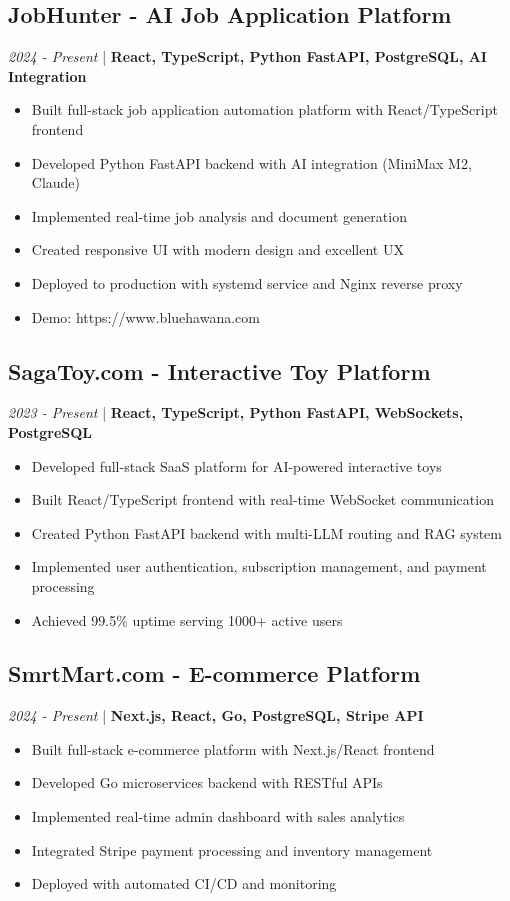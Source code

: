 \documentclass[11pt,a4paper]{article}
\begin{document}
\subsection*{JobHunter - AI Job Application Platform}
\textit{2024 - Present} | \textbf{React, TypeScript, Python FastAPI, PostgreSQL, AI Integration}
\begin{itemize}[leftmargin=*, itemsep=1pt]
\item Built full-stack job application automation platform with React/TypeScript frontend
\item Developed Python FastAPI backend with AI integration (MiniMax M2, Claude)
\item Implemented real-time job analysis and document generation
\item Created responsive UI with modern design and excellent UX
\item Deployed to production with systemd service and Nginx reverse proxy
\item Demo: https://www.bluehawana.com
\end{itemize}

\subsection*{SagaToy.com - Interactive Toy Platform}
\textit{2023 - Present} | \textbf{React, TypeScript, Python FastAPI, WebSockets, PostgreSQL}
\begin{itemize}[leftmargin=*, itemsep=1pt]
\item Developed full-stack SaaS platform for AI-powered interactive toys
\item Built React/TypeScript frontend with real-time WebSocket communication
\item Created Python FastAPI backend with multi-LLM routing and RAG system
\item Implemented user authentication, subscription management, and payment processing
\item Achieved 99.5\% uptime serving 1000+ active users
\end{itemize}

\subsection*{SmrtMart.com - E-commerce Platform}
\textit{2024 - Present} | \textbf{Next.js, React, Go, PostgreSQL, Stripe API}
\begin{itemize}[leftmargin=*, itemsep=1pt]
\item Built full-stack e-commerce platform with Next.js/React frontend
\item Developed Go microservices backend with RESTful APIs
\item Implemented real-time admin dashboard with sales analytics
\item Integrated Stripe payment processing and inventory management
\item Deployed with automated CI/CD and monitoring
\end{itemize}
\end{document}
